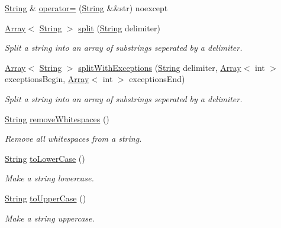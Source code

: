 \begin{DoxyCompactItemize}
\item 
\mbox{\hyperlink{class_rad_j_a_v_1_1_string}{String}} \& \mbox{\hyperlink{class_rad_j_a_v_1_1_string_a80167c584645eafafac7f83015c00322}{operator=}} (\mbox{\hyperlink{class_rad_j_a_v_1_1_string}{String}} \&\&str) noexcept
\item 
\mbox{\hyperlink{class_rad_j_a_v_1_1_array}{Array}}$<$ \mbox{\hyperlink{class_rad_j_a_v_1_1_string}{String}} $>$ \mbox{\hyperlink{class_rad_j_a_v_1_1_string_a64030b61ade099d5b084288d8f6b211a}{split}} (\mbox{\hyperlink{class_rad_j_a_v_1_1_string}{String}} delimiter)
\begin{DoxyCompactList}\small\item\em Split a string into an array of substrings seperated by a delimiter. \end{DoxyCompactList}\item 
\mbox{\hyperlink{class_rad_j_a_v_1_1_array}{Array}}$<$ \mbox{\hyperlink{class_rad_j_a_v_1_1_string}{String}} $>$ \mbox{\hyperlink{class_rad_j_a_v_1_1_string_aa2a6f4181fca6f1c999b8f9e3e098d9e}{split\+With\+Exceptions}} (\mbox{\hyperlink{class_rad_j_a_v_1_1_string}{String}} delimiter, \mbox{\hyperlink{class_rad_j_a_v_1_1_array}{Array}}$<$ int $>$ exceptions\+Begin, \mbox{\hyperlink{class_rad_j_a_v_1_1_array}{Array}}$<$ int $>$ exceptions\+End)
\begin{DoxyCompactList}\small\item\em Split a string into an array of substrings seperated by a delimiter. \end{DoxyCompactList}\item 
\mbox{\hyperlink{class_rad_j_a_v_1_1_string}{String}} \mbox{\hyperlink{class_rad_j_a_v_1_1_string_ab0343311b565d55201e97980f29c694d}{remove\+Whitespaces}} ()
\begin{DoxyCompactList}\small\item\em Remove all whitespaces from a string. \end{DoxyCompactList}\item 
\mbox{\hyperlink{class_rad_j_a_v_1_1_string}{String}} \mbox{\hyperlink{class_rad_j_a_v_1_1_string_a7b680e0853e2e221a7728b224ef3f2fe}{to\+Lower\+Case}} ()
\begin{DoxyCompactList}\small\item\em Make a string lowercase. \end{DoxyCompactList}\item 
\mbox{\hyperlink{class_rad_j_a_v_1_1_string}{String}} \mbox{\hyperlink{class_rad_j_a_v_1_1_string_a02e8c3b12ea21ce39d861050ee02627a}{to\+Upper\+Case}} ()
\begin{DoxyCompactList}\small\item\em Make a string uppercase. \end{DoxyCompactList}\item 

\end{DoxyCompactItemize}
